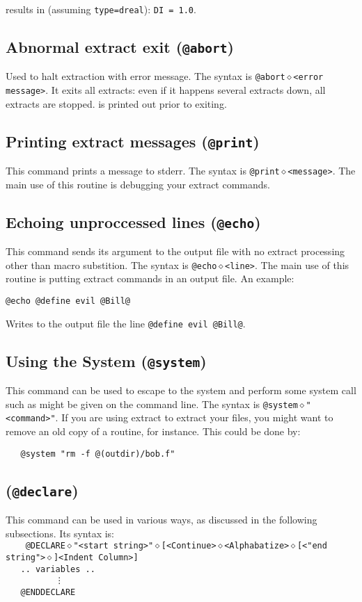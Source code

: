 results in (assuming {\tt type=dreal}): {\tt DI = 1.0}.

\subsection{Abnormal extract exit ({\tt @abort})}
Used to halt extraction with error message.  The syntax is
{\tt @abort$\diamond$<error message>}.  It exits all extracts:
even if it happens several extracts down, all extracts are stopped.
{\tt <error message>} is printed out prior to exiting.

\subsection{Printing extract messages ({\tt @print})}
This command prints a message to stderr.  The syntax is
{\tt @print$\diamond$<message>}.  The main use of this routine is
debugging your extract commands.

\subsection{Echoing unproccessed lines ({\tt @echo})}
This command sends its argument to the output file with no extract
processing other than macro substition.  The syntax is
{\tt @echo$\diamond$<line>}.  The main use of this routine is
putting extract commands in an output file.  An example:
\begin{verbatim}
@echo @define evil @Bill@
\end{verbatim}
Writes to the output file the line {\tt @define evil @Bill@}.

\subsection{Using the System ({\tt @system})}
This command can be used to escape to the system and perform some system
call such as might be given on the command line.  The syntax is
{\tt @system$\diamond$"<command>"}.  If you are using extract to extract
your files, you might want to remove an old copy of a routine, for instance.
This could be done by:
\begin{verbatim}
   @system "rm -f @(outdir)/bob.f"
\end{verbatim}

\subsection{({\tt @declare})}
This command can be used in various ways, as discussed in the following
subsections.  Its syntax is:\\
\noindent
{\tt
\verb+   +@DECLARE$\diamond$\verb+"<start string>"+$\diamond$[<Continue>$\diamond$<Alphabatize>$\diamond$[<"end string">$\diamond$]<Indent Column>]\\
\verb+   .. variables ..+\\
\verb+         + \vdots\\
\verb+   +@ENDDECLARE\\
}

